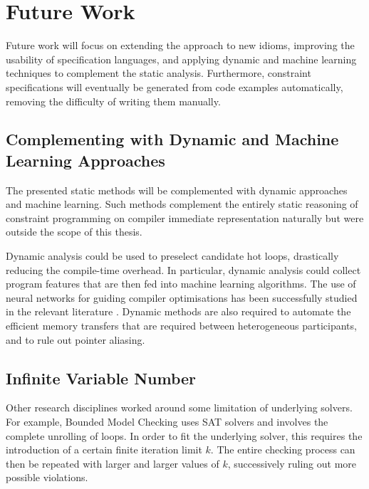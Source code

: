 \section{Future Work}

    Future work will focus on extending the approach to new idioms,
    improving the usability of specification languages, and
    applying dynamic and machine learning techniques to complement the static
    analysis.
    Furthermore, constraint specifications will eventually be generated from
    code examples automatically, removing the difficulty of writing them
    manually.

\subsection*{Complementing with Dynamic and Machine Learning Approaches}

    The presented static methods will be complemented with dynamic approaches
    and machine learning.
    Such methods complement the entirely static reasoning of constraint
    programming on compiler immediate representation naturally but were
    outside the scope of this thesis.

    Dynamic analysis could be used to preselect candidate hot loops, drastically
    reducing the compile-time overhead.
    In particular, dynamic analysis could collect program features that are
    then fed into machine learning algorithms.
    The use of neural networks for guiding compiler optimisations has been
    successfully studied in the relevant literature
    \citep{DBLP:journals/pieee/WangO18}.
    Dynamic methods are also required to automate the efficient memory transfers
    that are required between heterogeneous participants, and to rule out
    pointer aliasing.

\subsection*{Infinite Variable Number}

    Other research disciplines worked around some limitation of underlying
    solvers.
    For example, Bounded Model Checking \cite{Clarke:2001:BMC:510986.510987}
    uses SAT solvers and involves the complete unrolling of loops.
    In order to fit the underlying solver, this requires the introduction of a
    certain finite iteration limit $k$.
    The entire checking process can then be repeated with larger and larger
    values of $k$, successively ruling out more possible violations.

